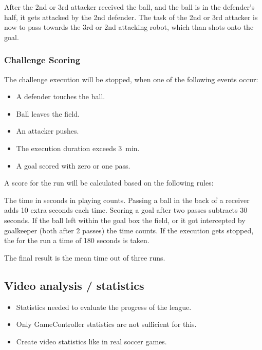     After the 2nd or 3rd attacker received the ball, and the ball is in the defender's half, it gets attacked by the 2nd defender. The task of the 2nd or 3rd attacker is now to pass towards the 3rd or 2nd attacking robot, which than shots onto the goal. 

    \subsubsection{Challenge Scoring}

    The challenge execution will be stopped, when one of the following events occur:

    \begin{itemize}
        \item A defender touches the ball.
        \item Ball leaves the field.
        \item An attacker pushes.
        \item The execution duration exceeds \qty{3}{\minute}.
        \item A goal scored with zero or one pass.
    \end{itemize}

    A score for the run will be calculated based on the following rules:

    The time in seconds in playing counts. Passing a ball in the back of a receiver adds 10 extra seconds each time. Scoring a goal after two passes subtracts 30 seconds.
    If the ball left within the goal box the field, or it got intercepted by goalkeeper (both after 2 passes) the time counts.
    If the execution gets stopped, the for the run a time of 180 seconds is taken.

    The final result is the mean time out of three runs.

\subsection{Video analysis / statistics}
\begin{itemize}
    \item Statistics needed to evaluate the progress of the league.
    \item Only GameController statistics are not sufficient for this.
    \item Create video statistics like in real soccer games.
\end{itemize}

